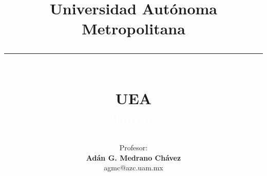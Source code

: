 \documentclass[table,dvipsnames,aspectratio=169]{beamer}
\title{{\LARGE Universidad Autónoma Metropolitana}\\
       \noindent\textcolor{Xoc}{\rule{0.9\textwidth}{1mm}}\\
       {\large UEA}\\
       \textcolor{white}{Tema:}\\
      }
\author[Adán G. Medrano-Chávez]{
         {\small Profesor:
         {\bf \\Adán G. Medrano Chávez}
         {\texttt \\agmc@azc.uam.mx}
         }
    }
\date{}
\begin{document}
\begin{frame}[t,plain]
  \titlepage
\end{frame}


\end{document}
